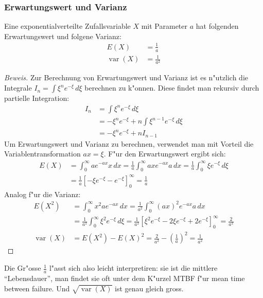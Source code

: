 \subsubsection{Erwartungswert und Varianz}
\begin{satz}Eine exponentialverteilte Zufallsvariable $X$ mit Parameter
$a$ hat folgenden Erwartungswert und folgene Varianz:
\begin{align*}
E(X)&=\frac1a\\
\operatorname{var}(X)&=\frac1{a^2}
\end{align*}
\end{satz}
\begin{proof}[Beweis]
Zur Berechnung von Erwartungswert und Varianz ist es n"utzlich die Integrale
$I_n=\int \xi^ne^{-\xi}\,d\xi$
berechnen zu k"onnen. Diese findet man rekursiv durch partielle Integration:
\begin{align*}
I_n&=\int \xi^ne^{-\xi}\,d\xi\\
&=-\xi^ne^{-\xi}+n\int \xi^{n-1}e^{-\xi}\,d\xi\\
&=-\xi^ne^{-\xi}+nI_{n-1}
\end{align*}
Um Erwartungswert und Varianz zu berechnen, verwendet man mit Vorteil die
Variablentransformation $ax=\xi$. F"ur den Erwartungswert ergibt sich:
\begin{align*}
E(X)&=\int_0^{\infty}ae^{-ax}x\,dx
=\frac1a\int_0^{\infty}ax e^{-ax}a\,dx
=\frac1a\int_0^{\infty}\xi e^{-\xi}\,d\xi\\
&=\frac1a\left[-\xi e^{-\xi}-e^{-\xi}\right]_0^\infty=\frac1a
\end{align*}
Analog f"ur die Varianz:
\begin{align*}
E(X^2)
&=
\int_0^{\infty}x^2ae^{-ax}\,dx
=\frac1{a^2}\int_0^{\infty}(ax)^2e^{-ax}a\,dx\\
&=\frac1{a^2}\int_0^{\infty}\xi^2e^{-\xi}\,d\xi
=\frac1{a^2}\left[\xi^2e^{-\xi}-2\xi e^{-\xi}+2e^{-\xi}\right]_0^\infty
=\frac2{a^2}
\\
\operatorname{var}(X)
&=E(X^2)-E(X)^2=\frac2{a^2}-\left(\frac1a\right)^2=\frac1{a^2}
\end{align*}
\end{proof}
Die Gr"osse $\frac1a$ l"asst sich also leicht interpretiren: sie ist die
mittlere ``Lebensdauer'', man findet sie oft unter dem K"urzel MTBF f"ur
mean time between failure.
Und $\sqrt{\operatorname{var}(X)}$ 
ist genau gleich gross. 
